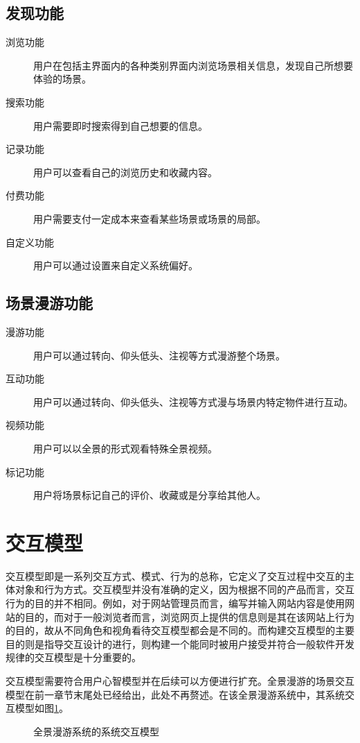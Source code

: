 \subsection{发现功能}
\begin{description}
	\item [浏览功能] 用户在包括主界面内的各种类别界面内浏览场景相关信息，发现自己所想要体验的场景。
	\item [搜索功能] 用户需要即时搜索得到自己想要的信息。
	\item [记录功能] 用户可以查看自己的浏览历史和收藏内容。
	\item [付费功能] 用户需要支付一定成本来查看某些场景或场景的局部。
	\item [自定义功能] 用户可以通过设置来自定义系统偏好。
\end{description}

\subsection{场景漫游功能}

\begin{description}
	\item [漫游功能] 用户可以通过转向、仰头低头、注视等方式漫游整个场景。
	\item [互动功能] 用户可以通过转向、仰头低头、注视等方式漫与场景内特定物件进行互动。
	\item [视频功能] 用户可以以全景的形式观看特殊全景视频。
	\item [标记功能] 用户将场景标记自己的评价、收藏或是分享给其他人。
\end{description}

\section{交互模型}
交互模型即是一系列交互方式、模式、行为的总称，它定义了交互过程中交互的主体对象和行为方式。交互模型并没有准确的定义，因为根据不同的产品而言，交互行为的目的并不相同。例如，对于网站管理员而言，编写并输入网站内容是使用网站的目的，而对于一般浏览者而言，浏览网页上提供的信息则是其在该网站上行为的目的，故从不同角色和视角看待交互模型都会是不同的。而构建交互模型的主要目的则是指导交互设计的进行，则构建一个能同时被用户接受并符合一般软件开发规律的交互模型是十分重要的。

交互模型需要符合用户心智模型并在后续可以方便进行扩充。全景漫游的场景交互模型在前一章节末尾处已经给出，此处不再赘述。在该全景漫游系统中，其系统交互模型如图\ref{fig:scene}。

\begin{figure}[htp]
\centering
{}
\caption{全景漫游系统的系统交互模型}
\label{fig:scene}
\end{figure}

